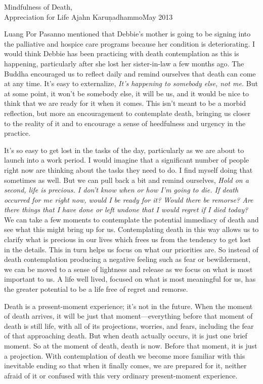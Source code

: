 {Mindfulness of Death,\\Appreciation for Life}
{Ajahn Karuṇadhammo}{May 2013}

Luang Por Pasanno mentioned that Debbie's mother is going to be signing 
into the palliative and hospice care programs because her condition is 
deteriorating. I would think Debbie has been practicing with death 
contemplation as this is happening, particularly after she lost her 
sister-in-law a few months ago. The Buddha encouraged us to reflect 
daily and remind ourselves that death can come at any time. It's easy 
to externalize, \emph{It's happening to somebody else, not me.} But at 
some point, it won't be somebody else, it will be us, and it would be 
nice to think that we are ready for it when it comes. This isn't meant 
to be a morbid reflection, but more an encouragement to contemplate 
death, bringing us closer to the reality of it and to encourage a sense 
of heedfulness and urgency in the practice.

It's so easy to get lost in the tasks of the day, particularly as we are
about to launch into a work period. I would imagine that a significant
number of people right now are thinking about the tasks they need to do.
I find myself doing that sometimes as well. But we can pull back a bit
and remind ourselves, \emph{Hold on a second, life is precious. I don't
know when or how I'm going to die. If death occurred for me right now,
would I be ready for it? Would there be remorse? Are there things that I
have done or left undone that I would regret if I died today?} We can
take a few moments to \mbox{contemplate} the potential immediacy of
death and see what this might bring up for us.  Contemplating death in
this way allows us to clarify what is precious in our lives which frees
us from the tendency to get lost in the details. This in turn helps us
focus on what our priorities are. So instead of death contemplation
producing a negative feeling such as fear or bewilderment, we can be
moved to a sense of lightness and release as we focus on what is most
important to us. A life well lived, focused on what is most meaningful
for us, has the greater potential to be a life free of regret and
remorse.

Death is a present-moment experience; it's not in the future. When the 
moment of death arrives, it will be just that moment---everything 
before that moment of death is still life, with all of its projections, 
worries, and fears, including the fear of that approaching death. But 
when death actually occurs, it is just one brief moment. So at the 
moment of death, death is now. Before that moment, it is just a 
projection. With contemplation of death we become more familiar with 
this inevitable ending so that when it finally comes, we are prepared 
for it, neither afraid of it or confused with this very ordinary 
present-moment experience.

